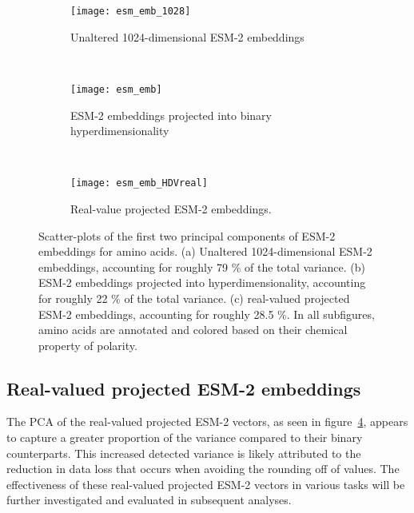 \begin{figure}[H]
\centering
\begin{minipage}[b]{.5\textwidth}
    \begin{subfigure}[b]{\textwidth}
    \texttt{[image: esm\_emb\_1028]}
    \caption{Unaltered 1024-dimensional ESM-2 embeddings}
    \label{fig:AAesm_pure}
\end{subfigure}
\end{minipage}
\\
\centering
\begin{minipage}[b]{.5\textwidth}
\begin{subfigure}[b]{\textwidth}
    \texttt{[image: esm\_emb]}
    \caption{ESM-2 embeddings projected into binary hyperdimensionality}
    \label{fig:AAesm}
\end{subfigure}
\end{minipage}
\\
\centering
\begin{minipage}[b]{.5\textwidth}
\begin{subfigure}[b]{\textwidth}
    \texttt{[image: esm\_emb\_HDVreal]}
    \caption{Real-value projected ESM-2 embeddings.}\label{fig:AAesmreal}
\end{subfigure}
\end{minipage}
\caption{Scatter-plots of the first two principal components of ESM-2 embeddings for amino acids. (a) Unaltered 1024-dimensional ESM-2 embeddings, accounting for roughly 79 \% of the total variance. (b) ESM-2 embeddings projected into hyperdimensionality, accounting for roughly 22 \% of the total variance. (c) real-valued projected ESM-2 embeddings, accounting for roughly 28.5 \%. In all subfigures, amino acids are annotated and colored based on their chemical property of polarity.}
\end{figure}

\subsection{Real-valued projected ESM-2 embeddings}
The PCA of the real-valued projected ESM-2 vectors, as seen in figure~\ref{fig:AAesmreal}, appears to capture a greater proportion of the variance compared to their binary counterparts. This increased detected variance is likely attributed to the reduction in data loss that occurs when avoiding the rounding off of values. The effectiveness of these real-valued projected ESM-2 vectors in various tasks will be further investigated and evaluated in subsequent analyses.

